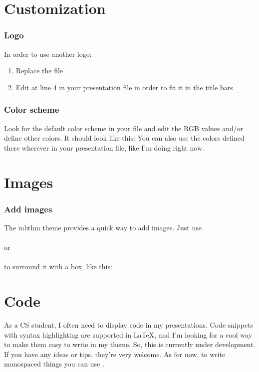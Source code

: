 \documentclass{beamer}
\begin{document}
	\section{Customization}
	\begin{frame}
		\frametitle{Logo}
		In order to use another logo:
		\begin{enumerate}
			\item Replace the  file
			\item Edit  at line 4 in your presentation file in order to fit it in the title bars
		\end{enumerate}
	\end{frame}
	\begin{frame}
		\frametitle{Color scheme}
		Look for the default color scheme in your  file and edit the RGB values and/or define other colors. It should look like this:
		You can also use the colors defined there wherever in your presentation file, like I'm doing \textcolor{ProgBarBGColor}{right now}.
	\end{frame}
	\section{Images}
	\begin{frame}
		\frametitle{Add images}
			The mhthm theme provides a quick way to add images. Just use \\ \hspace{1em}  \\ or \\ \hspace{1em}  \\ to surround it with a box, like this:
	\end{frame}
	\section{Code}
	\begin{frame}
		As a CS student, I often need to display code in my presentations. 
		Code snippets with syntax highlighting are supported in LaTeX, and I'm looking for a cool way to make them easy to write in my theme. So, this is currently under development. If you have any ideas or tips, they're very welcome. As for now, to write monospaced things you can use \code{\textbackslash code\{your code\}}.
	\end{frame}
\end{document}
